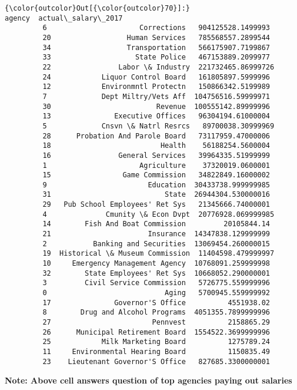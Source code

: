 \documentclass[11pt]{article}
\begin{document}
\begin{Verbatim}[commandchars=\\\{\}]
{\color{outcolor}Out[{\color{outcolor}70}]:}                             agency  actual\_salary\_2017
         6                      Corrections   904125528.1499993
         20                  Human Services   785568557.2899544
         34                  Transportation   566175907.7199867
         33                    State Police   467153889.2099977
         22                Labor \& Industry  221732465.86999726
         24            Liquor Control Board   161805897.5999996
         12            Environmntl Protectn   150866342.5199989
         7             Dept Miltry/Vets Aff  104756516.59999971
         30                         Revenue  100555142.89999996
         13               Executive Offices   96304194.61000004
         5             Cnsvn \& Natrl Resrcs   89700038.30999969
         28      Probation And Parole Board   73117959.47000006
         18                          Health    56188254.5600004
         16                General Services   39964335.51999999
         1                      Agriculture    37320019.0600001
         15                 Game Commission   34822849.16000002
         9                        Education  30433738.999999985
         31                           State  26944304.530000016
         29   Pub School Employees' Ret Sys   21345666.74000001
         4              Cmunity \& Econ Dvpt  20776928.069999985
         14        Fish And Boat Commission         20105844.14
         21                       Insurance  14347838.129999999
         2           Banking and Securities  13069454.260000015
         19  Historical \& Museum Commission  11404598.479999997
         10     Emergency Management Agency  10768091.259999998
         32        State Employees' Ret Sys  10668052.290000001
         3         Civil Service Commission   5726775.559999996
         0                            Aging   5700945.559999992
         17               Governor'S Office          4551938.02
         8        Drug and Alcohol Programs  4051355.7899999996
         27                        Pennvest          2158865.29
         26      Municipal Retirement Board  1554522.3699999996
         25            Milk Marketing Board          1275789.24
         11     Environmental Hearing Board          1150835.49
         23    Lieutenant Governor'S Office   827685.3300000001
\end{Verbatim}
            
    \textbf{Note: Above cell answers question of top agencies paying out
salaries}


    
    
    
    
\end{document}
